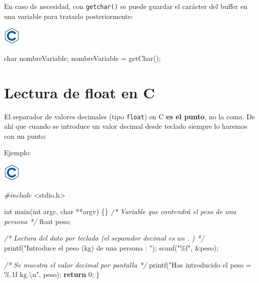 \documentclass[
]{book}
\newenvironment{Shaded}{\begin{snugshade}}{\end{snugshade}}
\newcommand{\CommentTok}[1]{\textcolor[rgb]{0.56,0.35,0.01}{\textit{#1}}}
\newcommand{\ControlFlowTok}[1]{\textcolor[rgb]{0.13,0.29,0.53}{\textbf{#1}}}
\newcommand{\DataTypeTok}[1]{\textcolor[rgb]{0.13,0.29,0.53}{#1}}
\newcommand{\DecValTok}[1]{\textcolor[rgb]{0.00,0.00,0.81}{#1}}
\newcommand{\ImportTok}[1]{#1}
\newcommand{\NormalTok}[1]{#1}
\newcommand{\PreprocessorTok}[1]{\textcolor[rgb]{0.56,0.35,0.01}{\textit{#1}}}
\newcommand{\SpecialCharTok}[1]{\textcolor[rgb]{0.00,0.00,0.00}{#1}}
\newcommand{\StringTok}[1]{\textcolor[rgb]{0.31,0.60,0.02}{#1}}
\begin{document}
En caso de necesidad, con \texttt{getchar()} se puede guardar el carácter del buffer en una variable para tratarlo posteriormente:

\includegraphics{./img/c.png}

\begin{Shaded}
\begin{Highlighting}[]
\DataTypeTok{char}\NormalTok{ nombreVariable;}
\NormalTok{nombreVariable = getChar();}
\end{Highlighting}
\end{Shaded}

\hypertarget{lectura-de-float-en-c}{%
\section{Lectura de float en C}\label{lectura-de-float-en-c}}

El separador de valores decimales (tipo \texttt{float}) en C \textbf{es el punto}, no la coma. De ahí que cuando se introduce un valor decimal desde teclado siempre lo haremos con un punto:

Ejemplo:

\includegraphics{./img/c.png}

\begin{Shaded}
\begin{Highlighting}[]
\PreprocessorTok{\#include }\ImportTok{\textless{}stdio.h\textgreater{}}

\DataTypeTok{int}\NormalTok{ main(}\DataTypeTok{int}\NormalTok{ argc, }\DataTypeTok{char}\NormalTok{ **argv) \{\}}
    \CommentTok{/* Variable que contendrá el peso de una persona */}
    \DataTypeTok{float}\NormalTok{ peso;}

    \CommentTok{/* Lectura del dato por teclado (el separador decimal es un . ) */}
\NormalTok{    printf(}\StringTok{"Introduce el peso (kg) de una persona : "}\NormalTok{);}
\NormalTok{    scanf(}\StringTok{"\%f"}\NormalTok{, \&peso);}

    \CommentTok{/* Se muestra el valor decimal por pantalla */}
\NormalTok{    printf(}\StringTok{"Has introducido el peso = \%.1f kg.}\SpecialCharTok{\textbackslash{}n}\StringTok{"}\NormalTok{, peso);}
    \ControlFlowTok{return} \DecValTok{0}\NormalTok{;}
\NormalTok{\}}
\end{Highlighting}
\end{Shaded}
\end{document}
